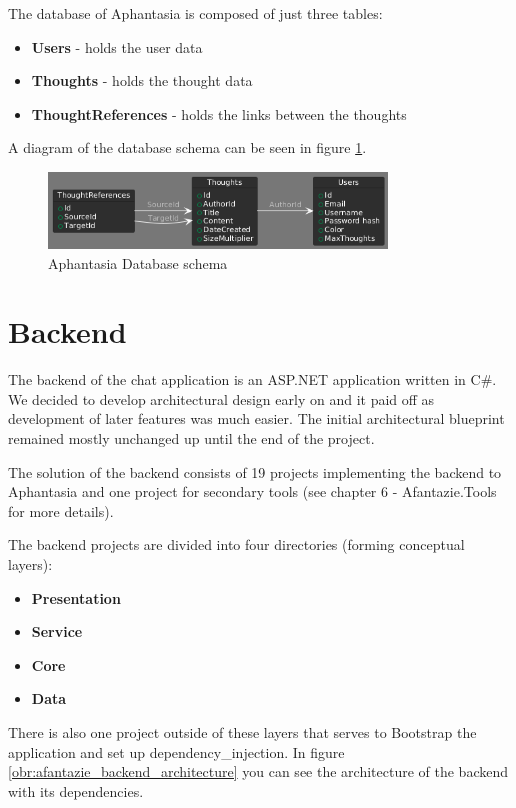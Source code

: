The database of Aphantasia is composed of just three tables:
\begin{itemize}
    \item \textbf{Users} - holds the user data
    \item \textbf{Thoughts} - holds the thought data
    \item \textbf{ThoughtReferences} - holds the links between the thoughts
\end{itemize}

A diagram of the database schema can be seen in figure \ref{obr:afantazie_database_schema}.

\begin{figure}[p]\centering
    \includegraphics[width=90mm]{img/afantazie_database_schema.png}
    \caption{Aphantasia Database schema}
    \label{obr:afantazie_database_schema}
\end{figure}


\section{Backend}
The backend of the chat application is an ASP.NET application written in C\#.
We decided to develop architectural design early on and it paid off as development of later features was much easier. 
The initial architectural blueprint remained mostly unchanged up until the end of the project.

The solution of the backend consists of 19 projects implementing the backend to Aphantasia and one project for secondary tools (see chapter 6 - Afantazie.Tools for more details). 

The backend projects are divided into four directories (forming conceptual layers):
\begin{itemize}
    \item \textbf{Presentation}
    \item \textbf{Service}
    \item \textbf{Core} 
    \item \textbf{Data}
\end{itemize}

There is also one project outside of these layers that serves to Bootstrap the application and set up \gls{dependency_injection}.
In figure \ref{obr:afantazie_backend_architecture} you can see the architecture of the backend with its dependencies.

